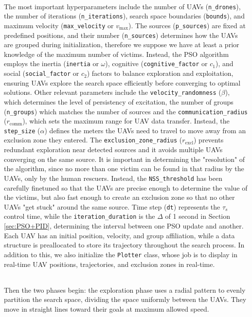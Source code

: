 \documentclass[main]{subfiles}
\begin{document}
\noindent\\
The most important hyperparameters 
include the number of UAVs (\texttt{n\_drones}), 
the number of iterations (\texttt{n\_iterations}), 
search space boundaries (\texttt{bounds}), 
and maximum velocity (\texttt{max\_velocity} or $v_\text{max}$). 
The sources (\texttt{p\_sources}) are fixed at predefined positions, 
and their number (\texttt{n\_sources}) determines how the UAVs are grouped 
during initialization, therefore 
we suppose we have at least a prior knowledge 
of the maximum number of victims. Instead, the PSO algorithm employs 
the inertia (\texttt{inertia} or $\omega$), cognitive (\texttt{cognitive\_factor} or $c_1$), 
and social (\texttt{social\_factor} or $c_2$) factors to 
balance exploration and exploitation, 
ensuring UAVs explore the search space efficiently
before converging to optimal solutions.
Other relevant parameters include the \texttt{velocity\_randomness} ($\beta$), 
which determines the level of persistency of excitation, the number of groups 
(\texttt{n\_groups}) which matches the number of sources and
the \texttt{communication\_radius} ($r_\text{comm}$), which sets the maximum range for UAV 
data transfer.
Instead, the \texttt{step\_size} ($\alpha$) defines the meters the UAVs need to 
travel to move away from an exclusion zone they entered. 
The \texttt{exclusion\_zone\_radius} ($r_\text{excl}$) prevents redundant 
exploration near detected sources and it avoids multiple UAVs 
converging on the same source. It is important in determining
the "resolution" of the algorithm, since no more than one victim can be found in that
radius by the UAVs, only by the human rescuers.
Instead, the  \texttt{NSS\_threshold} has been carefully finetuned
so that the UAVs are precise enough to determine the value of the victims,
but also fast enough to create an exclusion zone so that no other UAVs
"get stuck" around the same source.
Time step (\texttt{dt}) represents 
the $\tau_s$ control time, while the \texttt{iteration\_duration} 
is the $\Delta$ of 1 second in Section \ref{sec:PSO+PID}, determining the interval between one PSO 
update and another.
Each UAV has an initial position, velocity, and group affiliation, 
while a data structure is preallocated to store its trajectory 
throughout the search process.
In addition to this, we also initialize the \texttt{Plotter} class, 
whose job is to display in real-time UAV positions, trajectories, 
and exclusion zones in real-time.

\noindent\\
Then the two phases begin:
the exploration phase uses a radial pattern to evenly partition 
the search space, dividing the space uniformly 
between the UAVs. 
They move in straight lines toward their goals at maximum 
allowed speed. 
\end{document}
